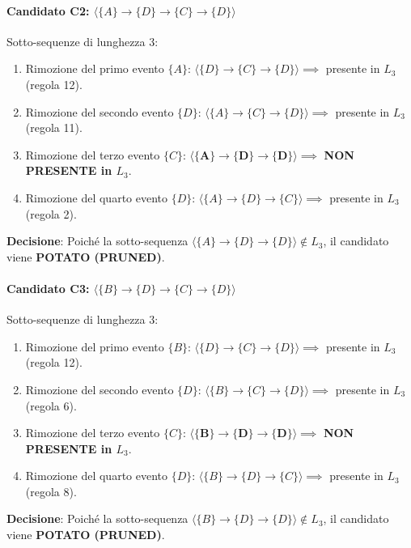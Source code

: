 \paragraph{Candidato C2: \texorpdfstring{$\langle \{A\} \to \{D\} \to \{C\} \to \{D\} \rangle$}{C2}}
Sotto-sequenze di lunghezza 3:
\begin{enumerate}
    \item Rimozione del primo evento $\{A\}$: $\langle \{D\} \to \{C\} \to \{D\} \rangle \implies$ presente in $L_3$ (regola 12).
    \item Rimozione del secondo evento $\{D\}$: $\langle \{A\} \to \{C\} \to \{D\} \rangle \implies$ presente in $L_3$ (regola 11).
    \item Rimozione del terzo evento $\{C\}$: $\mathbf{\langle \{A\} \to \{D\} \to \{D\} \rangle} \implies$ \textbf{NON PRESENTE in $L_3$}.
    \item Rimozione del quarto evento $\{D\}$: $\langle \{A\} \to \{D\} \to \{C\} \rangle \implies$ presente in $L_3$ (regola 2).
\end{enumerate}
\textbf{Decisione}: Poiché la sotto-sequenza $\langle \{A\} \to \{D\} \to \{D\} \rangle \notin L_3$, il candidato viene \textbf{POTATO (PRUNED)}.

\paragraph{Candidato C3: \texorpdfstring{$\langle \{B\} \to \{D\} \to \{C\} \to \{D\} \rangle$}{C3}}
Sotto-sequenze di lunghezza 3:
\begin{enumerate}
    \item Rimozione del primo evento $\{B\}$: $\langle \{D\} \to \{C\} \to \{D\} \rangle \implies$ presente in $L_3$ (regola 12).
    \item Rimozione del secondo evento $\{D\}$: $\langle \{B\} \to \{C\} \to \{D\} \rangle \implies$ presente in $L_3$ (regola 6).
    \item Rimozione del terzo evento $\{C\}$: $\mathbf{\langle \{B\} \to \{D\} \to \{D\} \rangle} \implies$ \textbf{NON PRESENTE in $L_3$}.
    \item Rimozione del quarto evento $\{D\}$: $\langle \{B\} \to \{D\} \to \{C\} \rangle \implies$ presente in $L_3$ (regola 8).
\end{enumerate}
\textbf{Decisione}: Poiché la sotto-sequenza $\langle \{B\} \to \{D\} \to \{D\} \rangle \notin L_3$, il candidato viene \textbf{POTATO (PRUNED)}.

